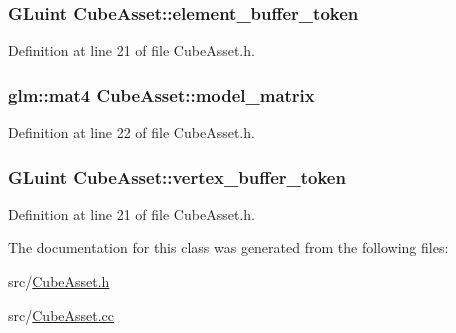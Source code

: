 \subsubsection[{element\+\_\+buffer\+\_\+token}]{\setlength{\rightskip}{0pt plus 5cm}G\+Luint Cube\+Asset\+::element\+\_\+buffer\+\_\+token\hspace{0.3cm}{\ttfamily [private]}}\label{class_cube_asset_a4fae699256e7c5633a8174a93ca8a0ec}


Definition at line 21 of file Cube\+Asset.\+h.

\hypertarget{class_cube_asset_a49b69783f209cc8268a8be7d46c803d6}{}
\subsubsection[{model\+\_\+matrix}]{\setlength{\rightskip}{0pt plus 5cm}glm\+::mat4 Cube\+Asset\+::model\+\_\+matrix\hspace{0.3cm}{\ttfamily [private]}}\label{class_cube_asset_a49b69783f209cc8268a8be7d46c803d6}


Definition at line 22 of file Cube\+Asset.\+h.

\hypertarget{class_cube_asset_a31bd098f60e2c24988316a9cc9335987}{}
\subsubsection[{vertex\+\_\+buffer\+\_\+token}]{\setlength{\rightskip}{0pt plus 5cm}G\+Luint Cube\+Asset\+::vertex\+\_\+buffer\+\_\+token\hspace{0.3cm}{\ttfamily [private]}}\label{class_cube_asset_a31bd098f60e2c24988316a9cc9335987}


Definition at line 21 of file Cube\+Asset.\+h.



The documentation for this class was generated from the following files\+:\begin{DoxyCompactItemize}
\item 
src/\hyperlink{_cube_asset_8h}{Cube\+Asset.\+h}\item 
src/\hyperlink{_cube_asset_8cc}{Cube\+Asset.\+cc}\end{DoxyCompactItemize}

